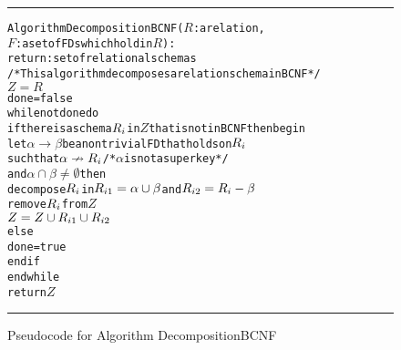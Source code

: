 \begin{figure}[htbp]
\hrule
\vspace{0.25cm}
\begin{alltt}
Algorithm DecompositionBCNF(\(R\): a relation,
             \(F\): a set of FDs which hold in \(R\)):
          return: set of relational schemas
/* This algorithm decomposes a relation schema in BCNF */
  \(Z = R\)
  done = false
  while not done do
    if there is a schema \(R\sb{i}\) in \(Z\)  that is not in BCNF then begin
      let \(\alpha \rightarrow \beta\) be a nontrivial FD that holds on \(R\sb{i}\)
        such that \(\alpha \nrightarrow R\sb{i}\) /* \(\alpha\) is not a superkey */
        and  \(\alpha \cap \beta \neq \emptyset\) then  
          decompose \(R\sb{i}\) in \(R\sb{i1} = \alpha \cup \beta\) and \(R\sb{i2} = R\sb{i} - \beta\)
          remove \(R\sb{i}\) from \(Z\) 
          \(Z = Z \cup R\sb{i1} \cup R\sb{i2}\)
    else 
      done = true
    end if 
  end while
  return \(Z\)
\end{alltt}
\caption{Pseudocode for Algorithm DecompositionBCNF}
\label{alg:decbcnf}
\hrule
\end{figure}
